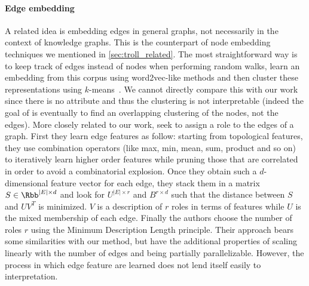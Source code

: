 
\paragraph{Edge embedding}
\label{par:erw_embed}

A related idea is embedding edges in general graphs, not necessarily in the context of knowledge
graphs. This is the counterpart of node embedding techniques we mentioned in
\autoref{sec:troll_related}. The most straightforward way is to keep track of edges instead of nodes
when performing random walks, learn an embedding from this corpus using word2vec-like methods and
then cluster these representations using $k$-means~\autocite{edgerep17}. We cannot directly compare
this with our work since there is no attribute and thus the clustering is not interpretable (indeed
the goal of \autocite{edgerep17} is eventually to find an overlapping clustering of the nodes, not
the edges). More closely related to our work, \textcite{ahmed2017roles} seek to assign a role to the
edges of a graph. First they learn edge features as follow: starting from topological features, they
use combination operators (like max, min, mean, sum, product and so on) to iteratively learn higher
order features while pruning those that are correlated in order to avoid a combinatorial explosion.
Once they obtain such a $d$-dimensional feature vector for each edge, they stack them in a matrix $S
\in \Rbb^{|E|\times d}$ and look for $U^{|E| \times r}$ and $B^{r \times d}$ such that the distance
between $S$ and $UV^T$ is minimized. $V$ is a description of $r$ roles in terms of features while
$U$ is the mixed membership of each edge. Finally the authors choose the number of roles $r$ using
the Minimum Description Length principle. Their approach bears some similarities with our \pqt{}
method, but have the additional properties of scaling linearly with the number of
edges and being partially parallelizable. However, the process in which edge feature are learned does not lend
itself easily to interpretation.

